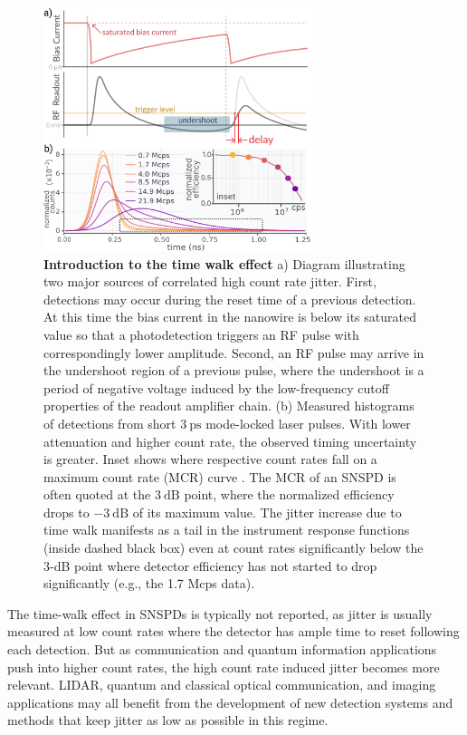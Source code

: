 \documentclass[11pt]{caltech_thesis} %
\begin{document}
\hypertarget{fig:jitterate_intro}{%
\begin{figure}
\centering
\includegraphics[width=0.7\textwidth,height=\textheight]{./chapter_03/figs/intro_jitterate_light.pdf}
\caption[{Introduction to the time walk effect}]{\textbf{Introduction to the time walk effect} a) Diagram illustrating two major sources of correlated high count rate jitter. First, detections may occur during the reset time of a previous detection. At this time the bias current in the nanowire is below its saturated value so that a photodetection triggers an RF pulse with correspondingly lower amplitude. Second, an RF pulse may arrive in the undershoot region of a previous pulse, where the undershoot is a period of negative voltage induced by the low-frequency cutoff properties of the readout amplifier chain. (b) Measured histograms of detections from short $3~\mathrm{ps}$ mode-locked laser pulses. With lower attenuation and higher count rate, the observed timing uncertainty is greater. Inset shows where respective count rates fall on a maximum count rate (MCR) curve \autocite{Zhang_MCR_2019}. The MCR of an SNSPD is often quoted at the $3~\mathrm{dB}$ point, where the normalized efficiency drops to $-3~\mathrm{dB}$ of its maximum value. The jitter increase due to time walk manifests as a tail in the instrument response functions (inside dashed black box) even at count rates significantly below the 3-dB point where detector efficiency has not started to drop significantly (e.g., the 1.7 Mcps data).}
\label{fig:jitterate_intro}
\end{figure}
}

The time-walk effect in SNSPDs is typically not reported, as jitter is usually measured at low count rates where the detector has ample time to reset following each detection. But as communication and quantum information applications push into higher count rates, the high count rate induced jitter becomes more relevant. LIDAR, quantum and classical optical communication, and imaging applications may all benefit from the development of new detection systems and methods that keep jitter as low as possible in this regime.
\end{document}
